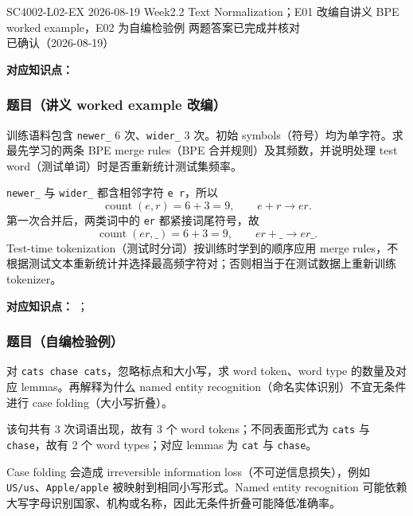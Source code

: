 

\examplemeta
  {SC4002-L02-EX}
  {2026-08-19}
  {Week2.2 Text Normalization；E01 改编自讲义 BPE worked example，E02 为自编检验例}
  {两题答案已完成并核对}
  {已确认（2026-08-19）}


\textbf{对应知识点：}

\subsubsection*{题目（讲义 worked example 改编）}

训练语料包含 \texttt{newer\_} 6 次、\texttt{wider\_} 3 次。初始 symbols（符号）均为单字符。求最先学习的两条 BPE merge rules（BPE 合并规则）及其频数，并说明处理 test word（测试单词）时是否重新统计测试集频率。

\begin{workedsolution}
\texttt{newer\_} 与 \texttt{wider\_} 都含相邻字符 \texttt{e r}，所以
\[
  \operatorname{count}(e,r)=6+3=9,
  \qquad e+r\rightarrow er.
\]
第一次合并后，两类词中的 \texttt{er} 都紧接词尾符号，故
\[
  \operatorname{count}(er,\_)=6+3=9,
  \qquad er+\_\rightarrow er\_.
\]
Test-time tokenization（测试时分词）按训练时学到的顺序应用 merge rules，不根据测试文本重新统计并选择最高频字符对；否则相当于在测试数据上重新训练 tokenizer。
\end{workedsolution}


\textbf{对应知识点：}
；

\subsubsection*{题目（自编检验例）}

对 \texttt{cats chase cats}，忽略标点和大小写，求 word token、word type 的数量及对应 lemmas。再解释为什么 named entity recognition（命名实体识别）不宜无条件进行 case folding（大小写折叠）。

\begin{workedsolution}
该句共有 3 次词语出现，故有 3 个 word tokens；不同表面形式为 \texttt{cats} 与 \texttt{chase}，故有 2 个 word types；对应 lemmas 为 \texttt{cat} 与 \texttt{chase}。

Case folding 会造成 irreversible information loss（不可逆信息损失），例如 \texttt{US/us}、\texttt{Apple/apple} 被映射到相同小写形式。Named entity recognition 可能依赖大写字母识别国家、机构或名称，因此无条件折叠可能降低准确率。
\end{workedsolution}
